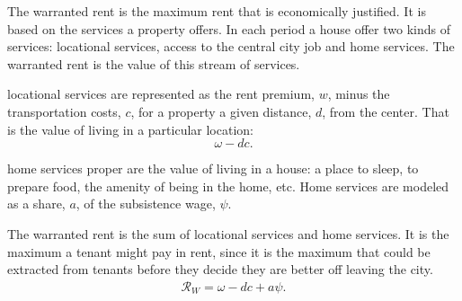 The {warranted rent} is the maximum rent that is economically justified.
It is based on the services a property offers.
 In each period a house offer two kinds of services: {locational services}, access to the central city job and {home services}.  The {warranted rent} is the value of this stream of services.


\Gls{locational services} are represented as %
the rent premium, $w$, minus the transportation costs, $c$, for a property a given distance, $d$, from the center. That is the value of living in a particular location:
\[\omega- {dc}.\]

\Gls{home services} proper are the value of living in a house: a place to sleep, to prepare food, the amenity of being in the home, etc. %
Home services are modeled as a share, $a$, of the subsistence wage, $\psi$. 

The \gls{warranted rent} is the sum of locational services and home services.
It is the maximum a tenant might pay in rent, since it is the maximum that could be extracted from tenants before they decide they are better off leaving the city.
\begin{align}
\mathcal{R}_W=\omega- {dc} + a\psi.
\label{eqn-housing-price}
\end{align}

